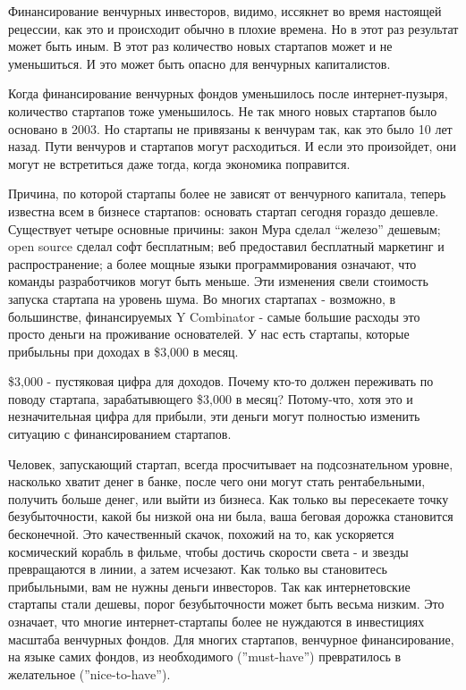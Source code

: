 \documentclass[ebook,12pt,oneside,openany]{memoir}
\begin{document}
\maketitle

Финансирование венчурных инвесторов, видимо, иссякнет во время
настоящей рецессии, как это и происходит обычно в плохие времена. Но в
этот раз результат может быть иным. В этот раз количество новых
стартапов может и не уменьшиться. И это может быть опасно для
венчурных капиталистов.

Когда финансирование венчурных фондов уменьшилось после
интернет-пузыря, количество стартапов тоже уменьшилось. Не так много
новых стартапов было основано в 2003. Но стартапы не привязаны к
венчурам так, как это было 10 лет назад. Пути венчуров и стартапов
могут расходиться. И если это произойдет, они могут не встретиться
даже тогда, когда экономика поправится.

Причина, по которой стартапы более не зависят от венчурного капитала,
теперь известна всем в бизнесе стартапов: основать стартап сегодня
гораздо дешевле. Существует четыре основные причины: закон Мура сделал
“железо” дешевым; open source сделал софт бесплатным; веб предоставил
бесплатный маркетинг и распространение; а более мощные языки
программирования означают, что команды разработчиков могут быть
меньше. Эти изменения свели стоимость запуска стартапа на уровень
шума. Во многих стартапах - возможно, в большинстве, финансируемых Y
Combinator - самые большие расходы это просто деньги на проживание
основателей. У нас есть стартапы, которые прибыльны при доходах в
\$3,000 в месяц.

\$3,000 - пустяковая цифра для доходов. Почему кто-то должен
переживать по поводу стартапа, зарабатывющего \$3,000 в месяц?
Потому-что, хотя это и незначительная цифра для прибыли, эти деньги
могут полностью изменить ситуацию с финансированием стартапов.

Человек, запускающий стартап, всегда просчитывает на подсознательном
уровне, насколько хватит денег в банке, после чего они могут стать
рентабельными, получить больше денег, или выйти из бизнеса. Как только
вы пересекаете точку безубыточности, какой бы низкой она ни была, ваша
беговая дорожка становится бесконечной. Это качественный скачок,
похожий на то, как ускоряется космический корабль в фильме, чтобы
достичь скорости света - и звезды превращаются в линии, а затем
исчезают. Как только вы становитесь прибыльными, вам не нужны деньги
инвесторов. Так как интернетовские стартапы стали дешевы, порог
безубыточности может быть весьма низким. Это означает, что многие
интернет-стартапы более не нуждаются в инвестициях масштаба венчурных
фондов. Для многих стартапов, венчурное финансирование, на языке самих
фондов, из необходимого (”must-have”) превратилось в желательное
(”nice-to-have”).
\end{document}
